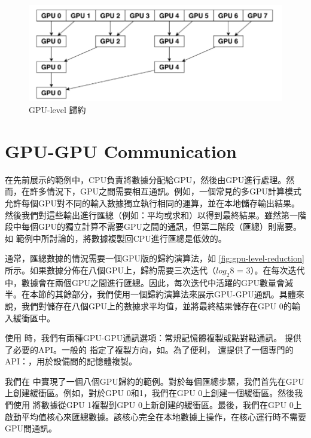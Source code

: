 \begin{figure}[h]
    \centering
    \includegraphics[width=0.75\linewidth]{FileAusiliari//Screenshots/Figure10-1.png}
    \caption{GPU-level 歸約}
    \label{fig:gpu-level-reduction}
\end{figure}

\section{GPU-GPU Communication} \label{sec:10.5}

在先前展示的範例中，CPU負責將數據分配給GPU，然後由GPU進行處理。然而，在許多情況下，GPU之間需要相互通訊。例如，一個常見的多GPU計算模式允許每個GPU對不同的輸入數據獨立執行相同的運算，並在本地儲存輸出結果。然後我們對這些輸出進行匯總（例如：平均或求和）以得到最終結果。雖然第一階段中每個GPU的獨立計算不需要GPU之間的通訊，但第二階段（匯總）則需要。如 範例中所討論的，將數據複製回CPU進行匯總是低效的。

通常，匯總數據的情況需要一個GPU版的歸約演算法，如 \autoref{fig:gpu-level-reduction} 所示。如果數據分佈在八個GPU上，歸約需要三次迭代（$log_{2}8$ = 3）。在每次迭代中，數據會在兩個GPU之間進行匯總。因此，每次迭代中活躍的GPU數量會減半。在本節的其餘部分，我們使用一個歸約演算法來展示GPU-GPU通訊。具體來說，我們對儲存在八個GPU上的數據求平均值，並將最終結果儲存在GPU 0的輸入緩衝區中。

使用 時，我們有兩種GPU-GPU通訊選項：常規記憶體複製或點對點通訊。 提供了必要的API。一般的 指定了複製方向，如。為了便利， 還提供了一個專門的API：，用於設備間的記憶體複製。

我們在  中實現了一個八個GPU歸約的範例。對於每個匯總步驟，我們首先在GPU上創建緩衝區。例如，對於GPU 0和1，我們在GPU 0上創建一個緩衝區。然後我們使用 將數據從GPU 1複製到GPU 0上新創建的緩衝區。最後，我們在GPU 0上啟動平均值核心來匯總數據。該核心完全在本地數據上操作，在核心運行時不需要GPU間通訊。

